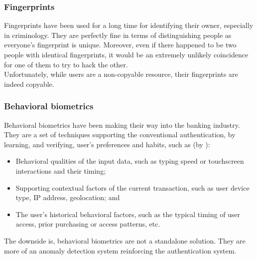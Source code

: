         \subsubsection*{Fingerprints}
            Fingerprints have been used for a long time for identifying their
            owner, especially in criminology. They are perfectly fine in terms of
            distinguishing people as everyone's fingerprint is unique. Moreover,
            even if there happened to be two people with identical fingerprints,
            it would be an extremely unlikely coincidence for one of them to try
            to hack the other.\\
            Unfortunately, while users are a non-copyable resource, their fingerprints
            are indeed copyable.

        \subsubsection*{Behavioral biometrics}
            Behavioral biometrics have been making their way into
            the banking industry. They are a set of techniques supporting the
            conventional authentication, by learning, and verifying, user's
            preferences and habits, such as (by \citeauthor{behavioral}):
            \begin{itemize}
                \item Behavioral qualities of the input data, such as typing
                      speed or touchscreen interactions and their timing;
                \item Supporting contextual factors of the current transaction,
                      such as user device type, IP address, geolocation; and
                \item The user’s historical behavioral factors, such as the
                      typical timing of user access, prior purchasing or access
                      patterns, etc.
            \end{itemize}
            The downside is, behavioral biometrics are not a standalone solution.
            They are more of an anomaly detection system reinforcing the authentication
            system.

